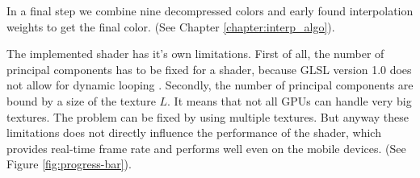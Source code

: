 In a final step we combine nine decompressed colors and early found interpolation weights to get the final color. (See Chapter \ref{chapter:interp_algo}).

The implemented shader has it's own limitations. First of all, the number of principal components has to be fixed for a shader, because GLSL version 1.0 does not allow for dynamic looping \cite{glsl}.
Secondly, the number of principal components are bound by a size of the texture $L$. It means that not all GPUs can handle very big textures. The problem can be fixed by using multiple textures.
But anyway these limitations does not directly influence the performance of the shader, which provides real-time frame rate and performs well even on the mobile devices. (See Figure \ref{fig:progress-bar}).






 



